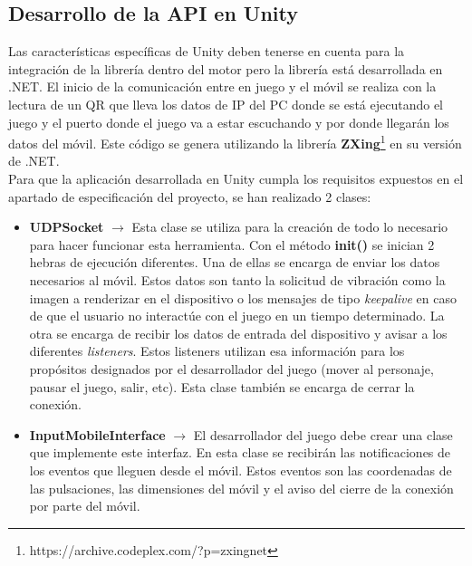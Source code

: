 \subsection {Desarrollo de la API en Unity}

Las caracter\'isticas espec\'ificas de Unity deben tenerse en cuenta para la integraci\'on de la librer\'ia dentro del motor pero la librer\'ia est\'a desarrollada en .NET. El inicio de la comunicaci\'on entre en juego y  el m\'ovil se realiza con la lectura de un QR que lleva los datos de IP del PC donde se est\'a ejecutando el juego y el puerto donde el juego va a estar escuchando y por donde llegar\'an los datos del m\'ovil. Este c\'odigo se genera utilizando la librer\'ia \textbf{ZXing}\footnote{https://archive.codeplex.com/?p=zxingnet} en su versi\'on de .NET. \\

Para que la aplicaci\'on desarrollada en Unity cumpla los requisitos expuestos en el apartado de especificaci\'on del proyecto, se han realizado 2 clases:\\

\begin {itemize}
\item \textbf{UDPSocket} $\rightarrow$ Esta clase se utiliza para la creaci\'on de todo lo necesario para hacer funcionar esta herramienta. Con el m\'etodo \textbf{init()} se inician 2 hebras de ejecuci\'on diferentes. Una de ellas se encarga de enviar los datos necesarios al m\'ovil. Estos datos son tanto la solicitud de vibraci\'on como la imagen a renderizar en el dispositivo o los mensajes de tipo \textit{keepalive} en caso de que el usuario no interact\'ue con el juego en un tiempo determinado. La otra se encarga de recibir los datos de entrada del dispositivo y avisar a los diferentes \textit{listeners}. Estos listeners utilizan esa informaci\'on para los prop\'ositos designados por el desarrollador del juego (mover al personaje, pausar el juego, salir, etc). Esta clase tambi\'en se encarga de cerrar la conexi\'on.

\item \textbf{InputMobileInterface} $\rightarrow$ El desarrollador del juego debe crear una clase que implemente este interfaz. En esta clase se recibir\'an las notificaciones de los eventos que lleguen desde el m\'ovil. Estos eventos son las coordenadas de las pulsaciones, las dimensiones del m\'ovil y el aviso del cierre de la conexi\'on por parte del m\'ovil.
\end {itemize}

